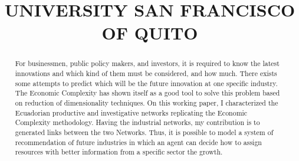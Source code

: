 \documentclass[12pt]{article}
\title{UNIVERSITY SAN FRANCISCO OF QUITO}
\begin{document}
\maketitle
\begin{abstract}

     For businessmen, public policy makers, and investors, it
    is required to know the latest innovations and which
    kind of them must be considered, and how much. There exists some attempts
    to predict which will be the future innovation at one
    specific industry. The Economic Complexity has shown itself
    as a good tool to solve this problem based on reduction of
    dimensionality techniques. On this working paper, 
    I characterized the Ecuadorian productive and investigative
    networks replicating the Economic Complexity
    methodology. Having the industrial networks, my contribution 
    is to generated links between the two Networks. Thus, it is 
    possible to model a system of recommendation of future 
    industries in which an agent can decide how to assign 
    resources with better information from a specific
    sector the growth.
    
\end{abstract}
\end{document}
